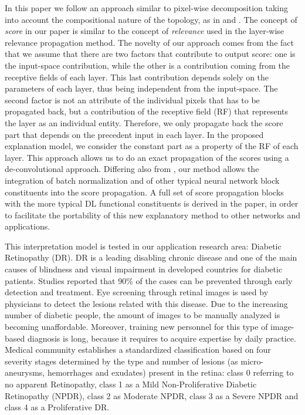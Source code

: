 \documentclass[review]{elsarticle}
\theoremstyle{definition} %
\theoremstyle{remark}
\begin{document}
In this paper we follow an approach similar to pixel-wise decomposition taking into account the compositional nature of the topology, as in \cite{zeiler2014visualizing} and \cite{bach2015pixel}. The concept of \emph{score} in our paper is similar to the concept of \emph{relevance} used in the layer-wise relevance propagation method. The novelty of our approach comes from the fact that we assume that there are two factors that contribute to output score: one is the input-space contribution, while the other is a contribution coming from the receptive fields of each layer. This last contribution depends solely on the parameters of each layer, thus being independent from the input-space. The second factor is not an attribute of the individual pixels that has to be propagated back, but a contribution of the receptive field (RF) that represents the layer as an individual entity. Therefore, we only propagate back the score part that depends on the precedent input in each layer. In the proposed explanation model, we consider the constant part as a property of the RF of each layer. This approach allows us to do an exact propagation of the scores using a de-convolutional approach. Differing also from \cite{zeiler2014visualizing}, our method allows the integration of batch normalization and of other typical neural network block constituents into the score propagation. A full set of score propagation blocks with the more typical DL functional constituents is derived in the paper, in order to facilitate the portability of this new explanatory method to other networks and applications.

This interpretation model is tested in our application research area: Diabetic Retinopathy (DR). DR is a leading disabling chronic disease  and  one of the main causes of blindness and visual impairment in developed countries for diabetic patients. Studies reported that 90\% of the cases can be prevented through early detection and treatment. Eye screening through retinal images is used by physicians to detect the lesions related with this disease. Due to the increasing number of diabetic people, the amount of images to be manually analyzed is becoming unaffordable. Moreover, training new personnel for this type of image-based diagnosis is long, because it requires to acquire expertise by daily practice. Medical community establishes a standardized classification based on four severity stages \cite{diaclass} determined by the type and number of lesions (as micro-aneurysms, hemorrhages and exudates) present in the retina: class 0 referring to no apparent Retinopathy, class 1 as a Mild Non-Proliferative Diabetic Retinopathy (NPDR), class 2 as Moderate NPDR, class 3 as a Severe NPDR and class 4 as a Proliferative DR. 
\end{document}
